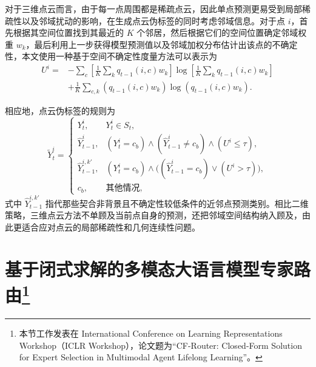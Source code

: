 对于三维点云而言，由于每一点周围都是稀疏点云，因此单点预测更易受到局部稀疏性以及邻域扰动的影响，在生成点云伪标签的同时考虑邻域信息。对于点 $i$，首先根据其空间位置找到其最近的 $K$ 个邻居，然后根据它们的空间位置确定邻域权重 $w_k$，最后利用上一步获得模型预测值以及邻域加权分布估计出该点的不确定性，本文使用一种基于空间不确定性度量方法可以表示为
\begin{equation}
\begin{aligned}
U^{i} = &- \sum_c \left[\frac{1}{K}\sum_k q_{t-1}(i,c)w_k\right]
\log\left[\frac{1}{K}\sum_k q_{t-1}(i,c)w_k\right] \\
&+ \frac{1}{K}\sum_{c,k} \left(q_{t-1}(i,c)w_k\right)
\log\left(q_{t-1}(i,c)w_k\right).
\end{aligned}
\label{eq:3d_uncertainty}
\end{equation}

相应地，点云伪标签的规则为
\begin{equation}
\tilde{Y}_t^{i}=
\begin{cases}
Y_t^{i}, & Y_t^{i} \in S_t, \\
\hat{Y}_{t-1}^{i}, & (Y_t^{i}=c_b) \wedge (\hat{Y}_{t-1}^{i} \neq c_b) \wedge (U^{i} \leq \tau), \\
\hat{Y}_{t-1}^{i,k'}, & (Y_t^{i}=c_b) \wedge \big((\hat{Y}_{t-1}^{i}=c_b) \vee (U^{i} > \tau)\big), \\
c_b, & \text{其他情况},
\end{cases}
\label{eq:3d_pseudo}
\end{equation}
式中 $\hat{Y}_{t-1}^{i,k'}$ 指代那些契合非背景且不确定性较低条件的近邻点预测类别。相比二维策略，三维点云方法不单顾及当前点自身的预测，还把邻域空间结构纳入顾及，由此更适合应对点云的局部稀疏性和几何连续性问题。

\section[基于闭式求解的多模态大语言模型专家路由]{基于闭式求解的多模态大语言模型专家路由\footnote{本节工作发表在 International Conference on Learning Representations Workshop（ICLR Workshop），论文题为``CF-Router: Closed-Form Solution for Expert Selection in Multimodal Agent Lifelong Learning''。}}


